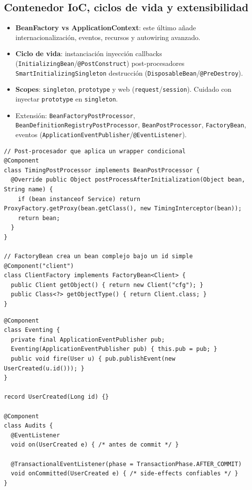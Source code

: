 \documentclass[11pt,a4paper]{article}
\begin{document}
\subsection{Contenedor IoC, ciclos de vida y extensibilidad}
\begin{itemize}[leftmargin=*]
  \item \textbf{BeanFactory vs ApplicationContext}: este último añade internacionalización, eventos, recursos y autowiring avanzado.
  \item \textbf{Ciclo de vida}: instanciación \textrightarrow{} inyección \textrightarrow{} callbacks (\texttt{InitializingBean}/\texttt{@PostConstruct}) \textrightarrow{} post-procesadores \textrightarrow{} \texttt{SmartInitializingSingleton} \textrightarrow{} destrucción (\texttt{DisposableBean}/\texttt{@PreDestroy}).
  \item \textbf{Scopes}: \texttt{singleton}, \texttt{prototype} y web (\texttt{request}/\texttt{session}). Cuidado con inyectar \texttt{prototype} en \texttt{singleton}.
  \item Extensión: \texttt{BeanFactoryPostProcessor}, \texttt{BeanDefinitionRegistryPostProcessor}, \texttt{BeanPostProcessor}, \texttt{FactoryBean}, eventos (\texttt{ApplicationEventPublisher}/\texttt{@EventListener}).
\end{itemize}

\begin{lstlisting}[style=javastyle, caption={BeanPostProcessor y FactoryBean}] 
// Post-procesador que aplica un wrapper condicional
@Component
class TimingPostProcessor implements BeanPostProcessor {
  @Override public Object postProcessAfterInitialization(Object bean, String name) {
    if (bean instanceof Service) return ProxyFactory.getProxy(bean.getClass(), new TimingInterceptor(bean));
    return bean;
  }
}

// FactoryBean crea un bean complejo bajo un id simple
@Component("client")
class ClientFactory implements FactoryBean<Client> {
  public Client getObject() { return new Client("cfg"); }
  public Class<?> getObjectType() { return Client.class; }
}
\end{lstlisting}

\begin{lstlisting}[style=javastyle, caption={Eventos y listeners transaccionales}] 
@Component
class Eventing {
  private final ApplicationEventPublisher pub;
  Eventing(ApplicationEventPublisher pub) { this.pub = pub; }
  public void fire(User u) { pub.publishEvent(new UserCreated(u.id())); }
}

record UserCreated(Long id) {}

@Component
class Audits {
  @EventListener
  void on(UserCreated e) { /* antes de commit */ }

  @TransactionalEventListener(phase = TransactionPhase.AFTER_COMMIT)
  void onCommitted(UserCreated e) { /* side-effects confiables */ }
}
\end{lstlisting}
\end{document}
